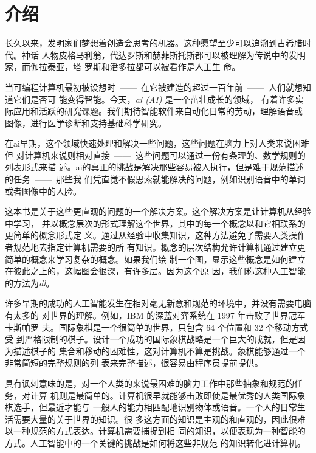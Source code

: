 
\chapter{介绍}
\label{ch:intro}

长久以来，发明家们梦想着创造会思考的机器。这种愿望至少可以追溯到古希腊时代。神话
人物皮格马利翁，代达罗斯和赫菲斯托斯都可以被理解为传说中的发明家，而伽拉泰亚，塔
罗斯和潘多拉都可以被看作是人工生
命\citep{ovid2004metamorphoses,sparkes1996red,1997works}。

当可编程计算机最初被设想时~——~在它被建造的超过一百年前~——~人们就想知道它们是否可
能变得智能\citep{Lovelace1842}。今天，\emph{\gls{ai} (AI)} 是一个茁壮成长的领域，
有着许多实际应用和活跃的研究课题。我们期待智能软件来自动化日常的劳动，理解语音或
图像，进行医学诊断和支持基础科学研究。

在\gls*{ai}早期，这个领域快速处理和解决一些问题，这些问题在脑力上对人类来说困难但
对计算机来说则相对直接~——~这些问题可以通过一份有条理的、数学规则的列表形式来描
述。\gls*{ai}的真正的挑战是解决那些容易被人执行，但是难于规范描述的任务~——~那些我
们凭直觉不假思索就能解决的问题，例如识别语音中的单词或者图像中的人脸。

这本书是关于这些更直观的问题的一个解决方案。这个解决方案是让计算机从经验中学习，
并以概念层次的形式理解这个世界，其中的每一个概念以和它相联系的更简单的概念形式定
义。通过从经验中收集知识，这种方法避免了需要人类操作者规范地去指定计算机需要的所
有知识。概念的层次结构允许计算机通过建立更简单的概念来学习复杂的概念。如果我们绘
制一个图，显示这些概念是如何建立在彼此之上的，这幅图会很深，有许多层。因为这个原
因，我们称这种人工智能的方法为\emph{\gls{dl}}。

许多早期的成功的人工智能发生在相对毫无新意和规范的环境中，并没有需要电脑有太多的
对世界的理解。例如，IBM 的深蓝对弈系统在 1997 年击败了世界冠军卡斯帕罗
夫\citep{Hsu2002}。国际象棋是一个很简单的世界，只包含 64 个位置和 32 个移动方式受
到严格限制的棋子。设计一个成功的国际象棋战略是一个巨大的成就，但是因为描述棋子的
集合和移动的困难性，这对计算机不算是挑战。象棋能够通过一个非常简短的完整规则的列
表来完整描述，很容易由程序员提前提供。

具有讽刺意味的是，对一个人类的来说最困难的脑力工作中那些抽象和规范的任务，对计算
机则是最简单的。计算机很早就能够击败即使是最优秀的人类国际象棋选手，但最近才能与
一般人的能力相匹配地识别物体或语音。一个人的日常生活需要大量的关于世界的知识。很
多这方面的知识是主观的和直观的，因此很难以一种规范的方式表达。计算机需要捕捉到相
同的知识，以便表现为一种智能的方式。人工智能中的一个关键的挑战是如何将这些非规范
的知识转化进计算机。


